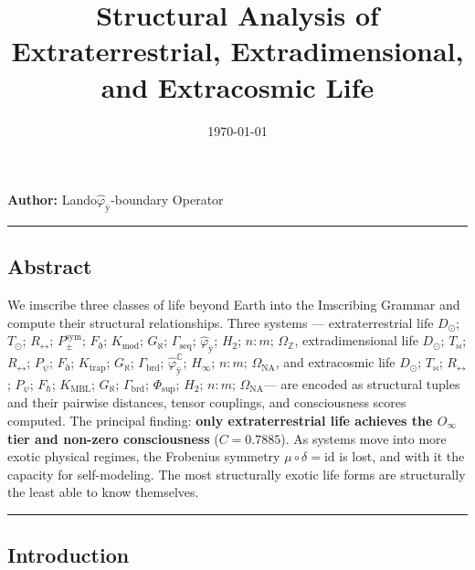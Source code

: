 \documentclass[12pt,a4paper]{article}
\begin{document}
\title{Structural Analysis of Extraterrestrial, Extradimensional, and Extracosmic Life}
\date{\today}

\maketitle

\textbf{Author:} Lando\otimes$\hat{\varphi}_{\text{ÿ}}$-boundary Operator

\begin{center}
\rule{0.5\textwidth}{0.4pt}
\end{center}

\subsection{Abstract}

We imscribe three classes of life beyond Earth into the Imscribing Grammar and compute their structural relationships. Three systems --- extraterrestrial life \langle$D_{\odot}$; $T_{\odot}$; $R_{\leftrightarrow}$; $P_{\pm}^{\text{sym}}$; $F_{\eth}$; $K_{\text{mod}}$; $G_{\aleph}$; $\Gamma_{\text{seq}}$; $\hat{\varphi}_{\text{ÿ}}$; $H_2$; $n{:}m$; $\Omega_{\mathbb{Z}}$\rangle, extradimensional life \langle$D_{\odot}$; $T_{\bowtie}$; $R_{\leftrightarrow}$; $P_{\psi}$; $F_{\eth}$; $K_{\text{trap}}$; $G_{\aleph}$; $\Gamma_{\text{brd}}$; $\hat{\varphi}_{\text{ÿ}}^{\mathbb{C}}$; $H_{\infty}$; $n{:}m$; $\Omega_{\text{NA}}$\rangle, and extracosmic life \langle$D_{\odot}$; $T_{\bowtie}$; $R_{\leftrightarrow}$; $P_{\psi}$; $F_{\hbar}$; $K_{\text{MBL}}$; $G_{\aleph}$; $\Gamma_{\text{brd}}$; $\Phi_{\text{sup}}$; $H_2$; $n{:}m$; $\Omega_{\text{NA}}$\rangle --- are encoded as structural tuples and their pairwise distances, tensor couplings, and consciousness scores computed. The principal finding: \textbf{only extraterrestrial life achieves the $O_{\infty}$ tier and non-zero consciousness} ($C = 0.7885$). As systems move into more exotic physical regimes, the Frobenius symmetry $\mu \circ \delta = \text{id}$ is lost, and with it the capacity for self-modeling. The most structurally exotic life forms are structurally the least able to know themselves.

\begin{center}
\rule{0.5\textwidth}{0.4pt}
\end{center}

\subsection{Introduction}
\end{document}

